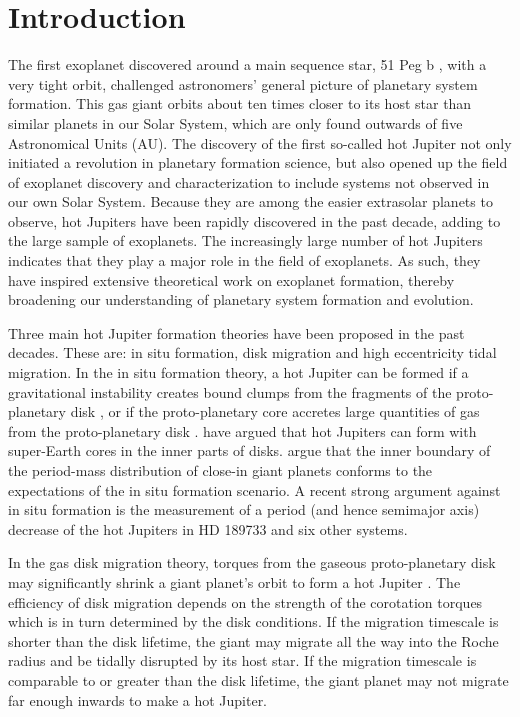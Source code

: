 \documentclass[twocolumn]{aastex63}
\begin{document}
\section{Introduction}
The first exoplanet discovered around a main sequence star, 51 Peg b \citep{Mayor1995}, with a very tight orbit, challenged astronomers' general picture of planetary system formation. This gas giant orbits about ten times closer to its host star than similar planets in our Solar System, which are only found outwards of five Astronomical Units (AU). The discovery of the first so-called hot Jupiter not only initiated a revolution in planetary formation science, but also opened up the field of exoplanet discovery and characterization to include systems not observed in our own Solar System. Because they are among the easier extrasolar planets to observe, hot Jupiters have been rapidly discovered in the past decade, adding to the large sample of exoplanets. The increasingly large number of hot Jupiters indicates that they play a major role in the field of exoplanets. As such, they have inspired extensive theoretical work on exoplanet formation, thereby broadening our understanding of planetary system formation and evolution. 

Three main hot Jupiter formation theories have been proposed in the past decades.  These are: in situ formation, disk migration and high eccentricity tidal migration.  In the in situ formation theory, a hot Jupiter can be formed if a gravitational instability creates bound clumps from the fragments of the proto-planetary disk \citep{Boss1997,Durisen2007}, or if the proto-planetary core accretes large quantities of gas from the proto-planetary disk \citep{Perri1974, Pollack1996,Chabrier2014}. \citet{Batygin2016} have argued that hot Jupiters can form with super-Earth cores in the inner parts of disks. \citet{Bailey2018} argue that the inner boundary of the period-mass distribution of close-in giant planets conforms to the expectations of the in situ formation scenario. A recent strong argument against in situ formation is the measurement \citep{Gunther2020} of a period (and hence semimajor axis) decrease of 
the hot Jupiters in HD 189733 and six other systems.

In the gas disk migration theory, torques from the gaseous proto-planetary disk may significantly shrink a giant planet's orbit to form a hot Jupiter \citep{Goldreich1980, Lin1986, Lin1996, Ida2008, Brucalassi2014}. The efficiency of disk migration depends on the strength of the corotation torques which is in turn determined by the disk conditions. If the migration timescale is shorter than the disk lifetime, the giant may migrate all the way into the Roche radius and be tidally disrupted by its host star. If the migration timescale is comparable to or greater than the disk lifetime, the giant planet may not migrate far enough inwards to make a hot Jupiter. 
\end{document}
